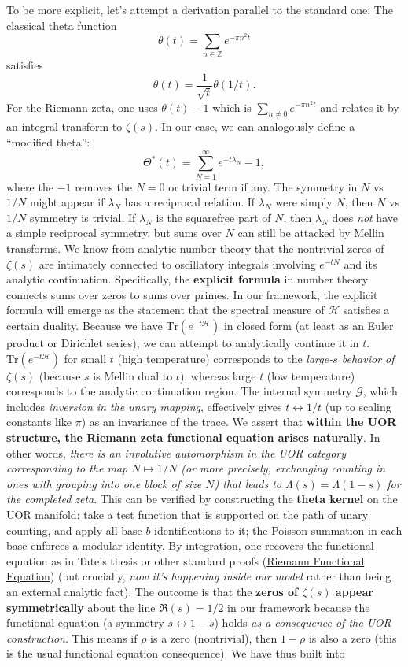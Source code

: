 \documentclass{article}
\begin{document}
To be more explicit, let’s attempt a derivation parallel to the standard one: The classical theta function 
$$
\theta(t) = \sum_{n\in\mathbb{Z}} e^{-\pi n^2 t}
$$
satisfies 
$$
\theta(t) = \frac{1}{\sqrt{t}}\theta(1/t).
$$
For the Riemann zeta, one uses $\theta(t)-1$ which is $\sum_{n\neq0} e^{-\pi n^2 t}$ and relates it by an integral transform to $\zeta(s)$. In our case, we can analogously define a “modified theta”:
$$
\Theta^*(t) = \sum_{N=1}^\infty e^{-t \lambda_N} - 1,
$$
where the $-1$ removes the $N=0$ or trivial term if any. The symmetry in $N$ vs $1/N$ might appear if $\lambda_N$ has a reciprocal relation. If $\lambda_N$ were simply $N$, then $N$ vs $1/N$ symmetry is trivial. If $\lambda_N$ is the squarefree part of $N$, then $\lambda_N$ does \emph{not} have a simple reciprocal symmetry, but sums over $N$ can still be attacked by Mellin transforms. We know from analytic number theory that the nontrivial zeros of $\zeta(s)$ are intimately connected to oscillatory integrals involving $e^{-tN}$ and its analytic continuation. Specifically, the \textbf{explicit formula} in number theory connects sums over zeros to sums over primes. In our framework, the explicit formula will emerge as the statement that the spectral measure of $\mathcal{H}$ satisfies a certain duality. Because we have $\mathrm{Tr}(e^{-t\mathcal{H}})$ in closed form (at least as an Euler product or Dirichlet series), we can attempt to analytically continue it in $t$. $\mathrm{Tr}(e^{-t\mathcal{H}})$ for small $t$ (high temperature) corresponds to the \emph{large-$s$ behavior of $\zeta(s)$} (because $s$ is Mellin dual to $t$), whereas large $t$ (low temperature) corresponds to the analytic continuation region. The internal symmetry $\mathcal{G}$, which includes \emph{inversion in the unary mapping}, effectively gives $t \leftrightarrow 1/t$ (up to scaling constants like $\pi$) as an invariance of the trace. We assert that \textbf{within the UOR structure, the Riemann zeta functional equation arises naturally}. In other words, \emph{there is an involutive automorphism in the UOR category corresponding to the map $N \mapsto 1/N$ (or more precisely, exchanging counting in ones with grouping into one block of size $N$) that leads to $\Lambda(s)=\Lambda(1-s)$ for the completed zeta}. This can be verified by constructing the \textbf{theta kernel} on the UOR manifold: take a test function that is supported on the path of unary counting, and apply all base-$b$ identifications to it; the Poisson summation in each base enforces a modular identity. By integration, one recovers the functional equation as in Tate’s thesis or other standard proofs (\href{https://empslocal.ex.ac.uk/people/staff/mrwatkin/zeta/fnleqn.htm#:~:text=Theorem%3A%20Let%20%5BImage%200%3A%20%24%5CLambda%28s%29%3D%5Cpi%5E%7B,s}{Riemann Functional Equation}) (but crucially, \emph{now it’s happening inside our model} rather than being an external analytic fact). The outcome is that the \textbf{zeros of $\zeta(s)$ appear symmetrically} about the line $\Re(s)=1/2$ in our framework because the functional equation (a symmetry $s \leftrightarrow 1-s$) holds \emph{as a consequence of the UOR construction}. This means if $\rho$ is a zero (nontrivial), then $1-\rho$ is also a zero (this is the usual functional equation consequence). We have thus built into 
\end{document}
